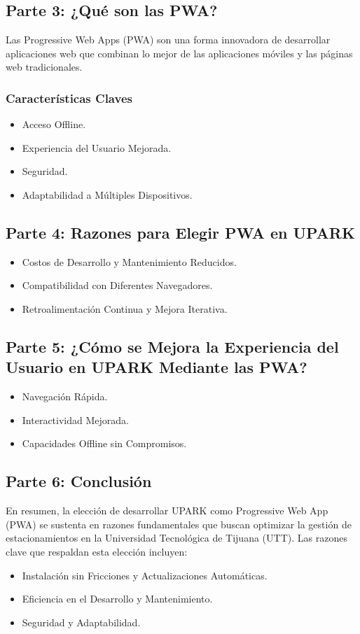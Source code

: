 \documentclass{article}
\begin{document}
\subsection*{Parte 3: ¿Qué son las PWA?}
Las Progressive Web Apps (PWA) son una forma innovadora de desarrollar aplicaciones web que combinan lo mejor de las aplicaciones móviles y las páginas web tradicionales.

\subsubsection*{Características Claves}
\begin{itemize}
    \item Acceso Offline.
    \item Experiencia del Usuario Mejorada.
    \item Seguridad.
    \item Adaptabilidad a Múltiples Dispositivos.
\end{itemize}

\subsection*{Parte 4: Razones para Elegir PWA en UPARK}
\begin{itemize}
    \item Costos de Desarrollo y Mantenimiento Reducidos.
    \item Compatibilidad con Diferentes Navegadores.
    \item Retroalimentación Continua y Mejora Iterativa.
\end{itemize}

\subsection*{Parte 5: ¿Cómo se Mejora la Experiencia del Usuario en UPARK Mediante las PWA?}
\begin{itemize}
    \item Navegación Rápida.
    \item Interactividad Mejorada.
    \item Capacidades Offline sin Compromisos.
\end{itemize}

\subsection*{Parte 6: Conclusión}
En resumen, la elección de desarrollar UPARK como Progressive Web App (PWA) se sustenta en razones fundamentales que buscan optimizar la gestión de estacionamientos en la Universidad Tecnológica de Tijuana (UTT). Las razones clave que respaldan esta elección incluyen:
\begin{itemize}
    \item Instalación sin Fricciones y Actualizaciones Automáticas.
    \item Eficiencia en el Desarrollo y Mantenimiento.
    \item Seguridad y Adaptabilidad.
\end{itemize}
\end{document}
